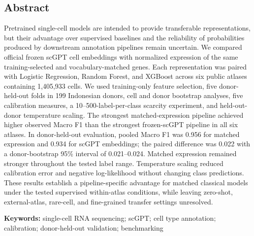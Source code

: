 \documentclass[11pt,a4paper]{article}
\begin{document}
\begin{titlepage}
\section*{Abstract}
Pretrained single-cell models are intended to provide transferable representations, but their advantage over supervised baselines and the reliability of probabilities produced by downstream annotation pipelines remain uncertain. We compared official frozen scGPT cell embeddings with normalized expression of the same training-selected and vocabulary-matched genes. Each representation was paired with Logistic Regression, Random Forest, and XGBoost across six public atlases containing 1,405,933 cells. We used training-only feature selection, five donor-held-out folds in 199 Indonesian donors, cell and donor bootstrap analyses, five calibration measures, a 10--500-label-per-class scarcity experiment, and held-out-donor temperature scaling. The strongest matched-expression pipeline achieved higher observed Macro F1 than the strongest frozen-scGPT pipeline in all six atlases. In donor-held-out evaluation, pooled Macro F1 was 0.956 for matched expression and 0.934 for scGPT embeddings; the paired difference was 0.022 with a donor-bootstrap 95\% interval of 0.021--0.024. Matched expression remained stronger throughout the tested label range. Temperature scaling reduced calibration error and negative log-likelihood without changing class predictions. These results establish a pipeline-specific advantage for matched classical models under the tested supervised within-atlas conditions, while leaving zero-shot, external-atlas, rare-cell, and fine-grained transfer settings unresolved.

\textbf{Keywords:} single-cell RNA sequencing; scGPT; cell type annotation; calibration; donor-held-out validation; benchmarking
\end{titlepage}

\onehalfspacing
\linenumbers











\end{document}
